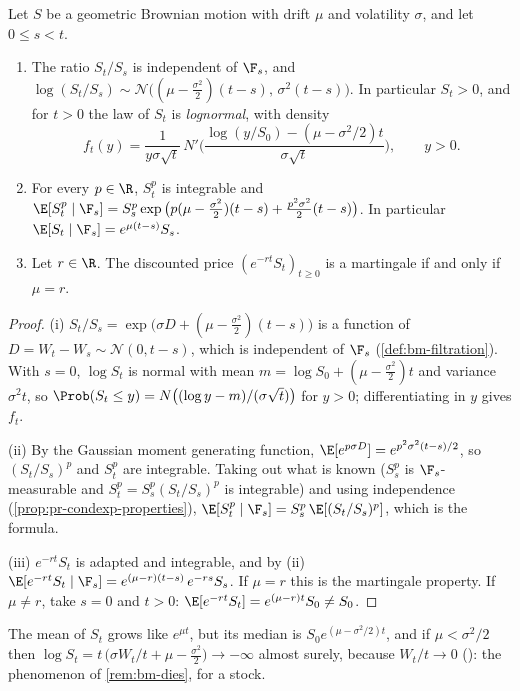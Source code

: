 \begin{proposition}\label{prop:bs-gbm-law}
Let $S$ be a geometric Brownian motion with drift $\mu$ and volatility $\sigma$, and let
$0\le s<t$.
\begin{enumerate}[label=(\roman*)]
  \item The ratio $S_t/S_s$ is independent of $\F_s$, and
    $\log(S_t/S_s)\sim\mathcal N\big((\mu-\frac{\sigma^2}2)(t-s),\,\sigma^2(t-s)\big)$. In
    particular $S_t>0$, and for $t>0$ the law of $S_t$ is \emph{lognormal}, with density
    \[
      f_t(y)=\frac{1}{y\sigma\sqrt t}\,N'\bigg(\frac{\log(y/S_0)-(\mu-\sigma^2/2)t}{\sigma\sqrt t}\bigg),
      \qquad y>0 .
    \]
  \item For every $p\in\R$, $S_t^p$ is integrable and
    $\E[S_t^p\mid\F_s]=S_s^p\exp\big(p(\mu-\frac{\sigma^2}2)(t-s)+\frac{p^2\sigma^2}{2}(t-s)\big)$.
    In particular $\E[S_t\mid\F_s]=e^{\mu(t-s)}S_s$.
  \item Let $r\in\R$. The discounted price $(e^{-rt}S_t)_{t\ge0}$ is a martingale if and only
    if $\mu=r$.
\end{enumerate}
\end{proposition}

\begin{proof}
(i) $S_t/S_s=\exp\big(\sigma D+(\mu-\frac{\sigma^2}2)(t-s)\big)$ is a function of
$D=W_t-W_s\sim\mathcal N(0,t-s)$, which is independent of $\F_s$
(\cref{def:bm-filtration}). With $s=0$, $\log S_t$ is normal with mean
$m=\log S_0+(\mu-\frac{\sigma^2}2)t$ and variance $\sigma^2t$, so
$\Prob(S_t\le y)=N\big((\log y-m)/(\sigma\sqrt t)\big)$ for $y>0$; differentiating in $y$
gives $f_t$.

(ii) By the Gaussian moment generating function, $\E[e^{p\sigma D}]=e^{p^2\sigma^2(t-s)/2}$,
so $(S_t/S_s)^p$ and $S_t^p$ are integrable. Taking out what is known ($S_s^p$ is
$\F_s$-measurable and $S_t^p=S_s^p(S_t/S_s)^p$ is integrable) and using independence
(\cref{prop:pr-condexp-properties}),
$\E[S_t^p\mid\F_s]=S_s^p\,\E[(S_t/S_s)^p]$, which is the formula.

(iii) $e^{-rt}S_t$ is adapted and integrable, and by (ii)
$\E[e^{-rt}S_t\mid\F_s]=e^{(\mu-r)(t-s)}\,e^{-rs}S_s$. If $\mu=r$ this is the martingale
property. If $\mu\ne r$, take $s=0$ and $t>0$: $\E[e^{-rt}S_t]=e^{(\mu-r)t}S_0\ne S_0$.
\end{proof}

The mean of $S_t$ grows like $e^{\mu t}$, but its median is $S_0e^{(\mu-\sigma^2/2)t}$, and
if $\mu<\sigma^2/2$ then $\log S_t=t\,\big(\sigma W_t/t+\mu-\frac{\sigma^2}{2}\big)\to-\infty$
almost surely, because $W_t/t\to0$ (): the phenomenon of
\cref{rem:bm-dies}, for a stock.

